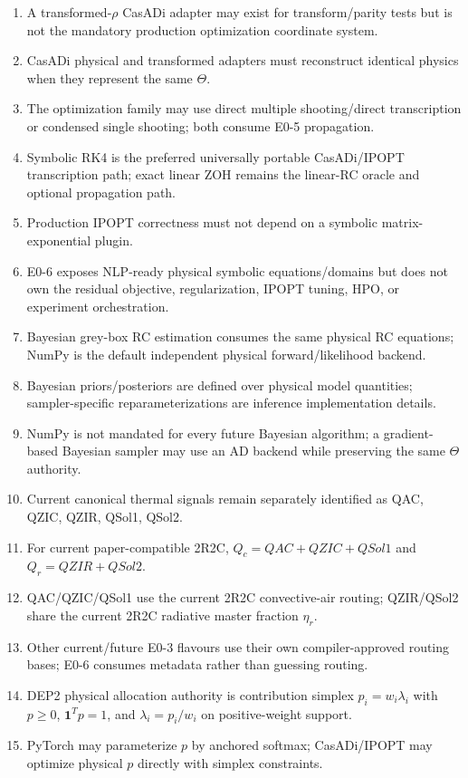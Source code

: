 \documentclass[11pt]{article}
\begin{document}
\begin{enumerate}[leftmargin=*]
\item A transformed-$\rho$ CasADi adapter may exist for transform/parity tests but is not the mandatory production optimization coordinate system.
\item CasADi physical and transformed adapters must reconstruct identical physics when they represent the same $\Theta$.
\item The optimization family may use direct multiple shooting/direct transcription or condensed single shooting; both consume E0-5 propagation.
\item Symbolic RK4 is the preferred universally portable CasADi/IPOPT transcription path; exact linear ZOH remains the linear-RC oracle and optional propagation path.
\item Production IPOPT correctness must not depend on a symbolic matrix-exponential plugin.
\item E0-6 exposes NLP-ready physical symbolic equations/domains but does not own the residual objective, regularization, IPOPT tuning, HPO, or experiment orchestration.
\item Bayesian grey-box RC estimation consumes the same physical RC equations; NumPy is the default independent physical forward/likelihood backend.
\item Bayesian priors/posteriors are defined over physical model quantities; sampler-specific reparameterizations are inference implementation details.
\item NumPy is not mandated for every future Bayesian algorithm; a gradient-based Bayesian sampler may use an AD backend while preserving the same $\Theta$ authority.
\item Current canonical thermal signals remain separately identified as QAC, QZIC, QZIR, QSol1, QSol2.
\item For current paper-compatible 2R2C, $Q_c=QAC+QZIC+QSol1$ and $Q_r=QZIR+QSol2$.
\item QAC/QZIC/QSol1 use the current 2R2C convective-air routing; QZIR/QSol2 share the current 2R2C radiative master fraction $\eta_r$.
\item Other current/future E0-3 flavours use their own compiler-approved routing bases; E0-6 consumes metadata rather than guessing routing.
\item DEP2 physical allocation authority is contribution simplex $p_i=w_i\lambda_i$ with $p\ge0$, $\mathbf1^Tp=1$, and $\lambda_i=p_i/w_i$ on positive-weight support.
\item PyTorch may parameterize $p$ by anchored softmax; CasADi/IPOPT may optimize physical $p$ directly with simplex constraints.

\end{enumerate}
\end{document}
